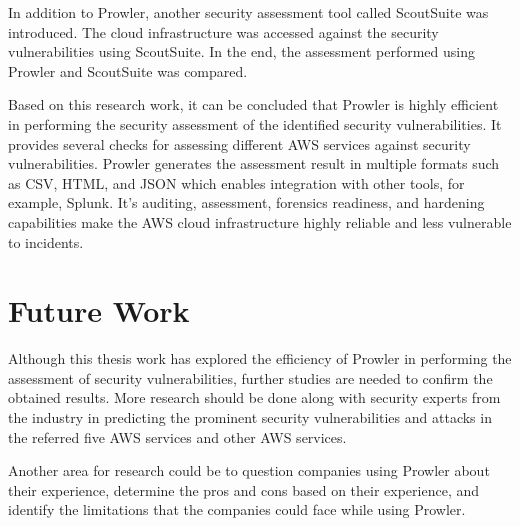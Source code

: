 \par In addition to Prowler, another security assessment
tool called ScoutSuite was introduced.
The cloud infrastructure was accessed against the security vulnerabilities using ScoutSuite.
In the end, the assessment performed using Prowler and
ScoutSuite was compared.

\par Based on this research work, it can be concluded that Prowler is highly efficient in performing the security assessment of the identified security vulnerabilities.
It provides several checks for assessing different AWS services against security vulnerabilities.
Prowler generates the assessment result in multiple formats such as CSV, HTML, and JSON which enables integration with other tools, for example, Splunk.
It’s auditing, assessment, forensics readiness, and hardening capabilities make the AWS cloud infrastructure highly reliable and less vulnerable to incidents.


\section{Future Work}

\par Although this thesis work has explored the efficiency of Prowler in performing the assessment of security vulnerabilities, further studies are needed to confirm the obtained results.
More research should be done along with security experts from the industry in predicting the prominent security vulnerabilities and attacks in the referred five AWS services and other AWS services.


\par Another area for research could be to question companies using Prowler about their experience, determine
the pros and cons based on their experience, and identify
the limitations that the companies could face while using
Prowler.